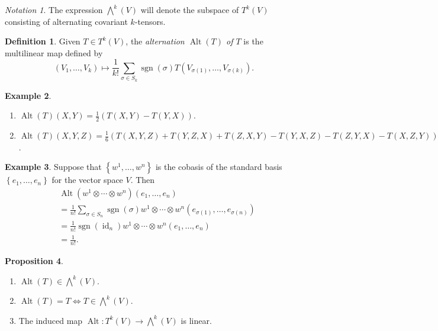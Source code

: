 \documentclass[10pt,letterpaper,cm]{nupset}
\theoremstyle{definition}
\newtheorem{definition}{Definition}[subsection]
\newtheorem{exmp}[definition]{Example}
\theoremstyle{theorem}
\newtheorem{prop}[definition]{Proposition}
\theoremstyle{remark}
\newtheorem*{notation}{Notation}
\newcommand{\1}{\mathbf{1}}
\newcommand{\0}{\vec 0}
\DeclareMathOperator{\id}{id}
\DeclareMathOperator{\Alt}{Alt}
\DeclareMathOperator{\sgn}{sgn}
\begin{document}
\begin{notation}
The  expression $\bigwedge^k(V)$ will denote the subspace of $T^k(V)$ consisting of alternating covariant $k$-tensors. 
\end{notation}

\begin{definition}
Given $T\in T^k(V)$, the \textit{alternation $\Alt(T)$ of $T$} is the multilinear map defined by $$ (V_1, \ldots, V_k) \mapsto \frac{1}{k!} \sum_{\sigma \in S_k} \sgn(\sigma) T\left(V_{\sigma(1)}, \ldots, V_{\sigma(k)}\right).$$
\end{definition}

\begin{exmp}\label{spec} $ $
\begin{enumerate}
\item $\Alt(T)(X,Y) = \frac{1}{2}\left(T(X,Y) - T(Y,X)\right)$.
\item  $\Alt(T)(X, Y, Z) = \frac{1}{6}\left(T(X, Y, Z) + T(Y, Z, X) + T(Z, X, Y)  -T(Y, X, Z)- T(Z, Y, X) -T(X, Z, Y)\right)$.
\end{enumerate}
\end{exmp}

\begin{exmp}\label{fact}
Suppose that $\left\{w^1, \ldots, w^n\right\}$ is the cobasis of the standard basis $ \left\{e_1, \ldots, e_n\right\}$ for the vector space $V$. Then
\begin{align*}
& \Alt(w^1 \otimes \cdots \otimes w^n)(e_1, \ldots, e_n)\\ & = \frac{1}{n!} \sum_{\sigma \in S_n} \sgn(\sigma)w^1 \otimes \cdots \otimes w^n\left(e_{\sigma(1)}, \ldots, e_{\sigma(n)}\right) \\ & =  \frac{1}{n!} \sgn\left(\id_n\right) w^1 \otimes \cdots \otimes w^n\left(e_{1}, \ldots, e_{n}\right) 
\\ & = \frac{1}{n!}.
\end{align*}
\end{exmp}

\begin{prop}\label{alt} $ $
\begin{enumerate}
\item $\Alt(T) \in \bigwedge^k(V)$.
\item $\Alt(T) = T \iff T \in \bigwedge^k(V)$.
\item The induced map $\Alt : T^k(V) \to \bigwedge^k(V)$ is linear. 
\end{enumerate}
\end{prop}
\end{document}
